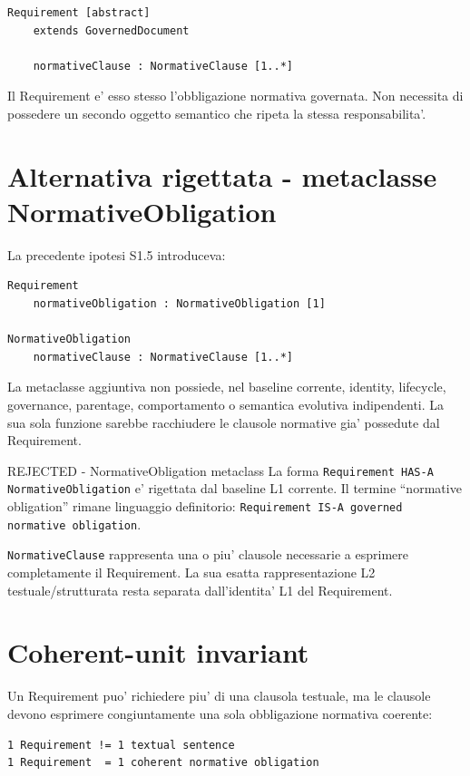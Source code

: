\documentclass[11pt,a4paper]{article}
\begin{document}
\begin{lstlisting}
Requirement [abstract]
    extends GovernedDocument

    normativeClause : NormativeClause [1..*]
\end{lstlisting}

Il Requirement e' esso stesso l'obbligazione normativa governata. Non necessita di possedere un secondo oggetto semantico che ripeta la stessa responsabilita'.

\section{Alternativa rigettata - metaclasse NormativeObligation}

La precedente ipotesi S1.5 introduceva:

\begin{lstlisting}
Requirement
    normativeObligation : NormativeObligation [1]

NormativeObligation
    normativeClause : NormativeClause [1..*]
\end{lstlisting}

La metaclasse aggiuntiva non possiede, nel baseline corrente, identity, lifecycle, governance, parentage, comportamento o semantica evolutiva indipendenti. La sua sola funzione sarebbe racchiudere le clausole normative gia' possedute dal Requirement.

\begin{openbox}{REJECTED - NormativeObligation metaclass}
La forma \texttt{Requirement HAS-A NormativeObligation} e' rigettata dal baseline L1 corrente. Il termine ``normative obligation'' rimane linguaggio definitorio: \texttt{Requirement IS-A governed normative obligation}.
\end{openbox}

\texttt{NormativeClause} rappresenta una o piu' clausole necessarie a esprimere completamente il Requirement. La sua esatta rappresentazione L2 testuale/strutturata resta separata dall'identita' L1 del Requirement.

\section{Coherent-unit invariant}

Un Requirement puo' richiedere piu' di una clausola testuale, ma le clausole devono esprimere congiuntamente una sola obbligazione normativa coerente:

\begin{lstlisting}
1 Requirement != 1 textual sentence
1 Requirement  = 1 coherent normative obligation
\end{lstlisting}
\end{document}

